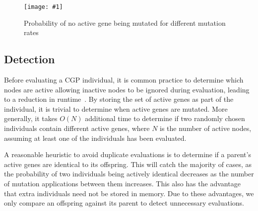 \documentclass[runningheads,a4paper]{llncs}
\newcommand{\includegraphicsfit}[1]
{\texttt{[image: \#1]}}
\begin{document}
\begin{figure}
  \centering
  \includegraphicsfit{Probability}
  \caption{Probability of no active gene being mutated for different mutation rates} 
  \label{fig:probability}
\end{figure}
\subsection{Detection}
Before evaluating a CGP individual, it is common practice to determine which
nodes are active allowing inactive nodes to be ignored during
evaluation, leading to a reduction in runtime~\cite{vasicek:2012:efficient}.
By storing the set of active genes as part of the individual, it is trivial
to determine when active genes are mutated.  More generally, it takes $O(N)$ additional time to determine
if two randomly chosen individuals contain different active genes, where $N$ is
the number of active nodes, assuming at least one of the individuals has been
evaluated.  

\begin{comment}
To exploit this knowledge to its fullest, all newly created individuals could
be compared against all previously evaluated individuals to determine if they
need to be evaluated.  While this can be optimized by storing a hash table of
actively unique individuals, the likelihood that two unrelated individuals are
actively identical may be too low to warrant the memory overhead required by being
this thorough.
\end{comment}

A reasonable heuristic to avoid duplicate evaluations is to determine if
a parent's active genes are identical to its offspring.  This will catch the
majority of cases, as the probability of two individuals being actively identical
decreases as the number of mutation applications
between them increases.  This also has the advantage that
extra individuals need not be stored in memory.  Due
to these advantages, we only compare an offspring against its parent
to detect unnecessary evaluations.
\end{document}
